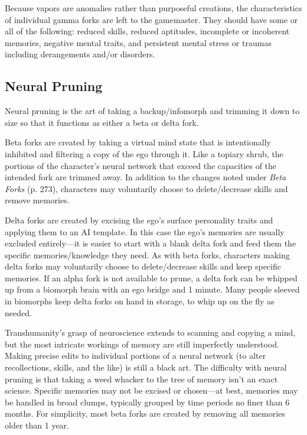 Because vapors are anomalies rather than purposeful
creations, the characteristics of individual gamma
forks are left to the gamemaster. They should have 
some or all of the following: reduced skills, reduced 
aptitudes, incomplete or incoherent memories, negative
mental traits, and persistent mental stress or traumas
including derangements and/or disorders.

\subsection{Neural Pruning}

Neural pruning is the art of taking a backup/infomorph
and trimming it down to size so that it functions
as either a beta or delta fork.

Beta forks are created by taking a virtual mind state 
that is intentionally inhibited and filtering a copy of 
the ego through it. Like a topiary shrub, the portions 
of the character's neural network that exceed the capacities
of the intended fork are trimmed away. In addition
to the changes noted under \textit{Beta Forks} (p. 273),
characters may voluntarily choose to delete/decrease 
skills and remove memories.

Delta forks are created by excising the ego's surface 
personality traits and applying them to an AI template. 
In this case the ego's memories are usually excluded 
entirely—it is easier to start with a blank delta fork 
and feed them the specific memories/knowledge they 
need. As with beta forks, characters making delta forks 
may voluntarily choose to delete/decrease skills and 
keep specific memories. If an alpha fork is not available
to prune, a delta fork can be whipped up from
a biomorph brain with an ego bridge and 1 minute. 
Many people sleeved in biomorphs keep delta forks on 
hand in storage, to whip up on the fly as needed.

Transhumanity's grasp of neuroscience extends to 
scanning and copying a mind, but the most intricate 
workings of memory are still imperfectly understood. 
Making precise edits to individual portions of a neural 
network (to alter recollections, skills, and the like) is 
still a black art. The difficulty with neural pruning is 
that taking a weed whacker to the tree of memory 
isn't an exact science. Specific memories may not be 
excised or chosen—at best, memories may be handled 
in broad clumps, typically grouped by time periods no 
finer than 6 months. For simplicity, most beta forks are 
created by removing all memories older than 1 year.

